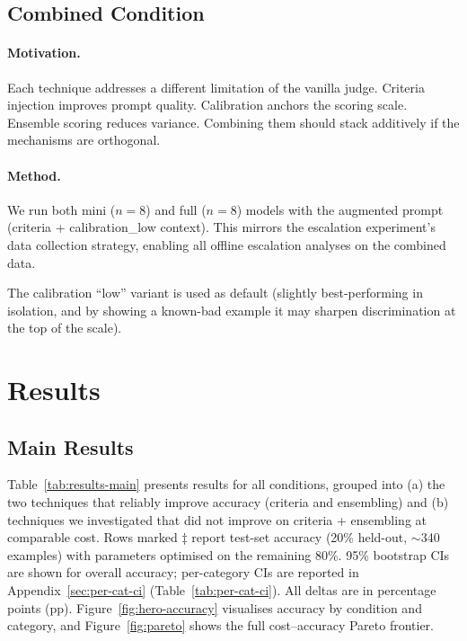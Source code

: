 \documentclass{article}
\begin{document}
\subsection{Combined Condition}
\label{sec:combined}

\paragraph{Motivation.} Each technique addresses a different limitation of the vanilla judge. Criteria injection improves prompt quality. Calibration anchors the scoring scale. Ensemble scoring reduces variance. Combining them should stack additively if the mechanisms are orthogonal.

\paragraph{Method.} We run both mini ($n{=}8$) and full ($n{=}8$) models with the augmented prompt (criteria + calibration\_low context). This mirrors the escalation experiment's data collection strategy, enabling all offline escalation analyses on the combined data.

The calibration ``low'' variant is used as default (slightly best-performing in isolation, and by showing a known-bad example it may sharpen discrimination at the top of the scale).

\section{Results}
\label{sec:experiments}

\subsection{Main Results}
\label{sec:main-results}

Table~\ref{tab:results-main} presents results for all conditions, grouped into (a) the two techniques that reliably improve accuracy (criteria and ensembling) and (b) techniques we investigated that did not improve on criteria + ensembling at comparable cost. Rows marked $\ddagger$ report test-set accuracy (20\% held-out, ${\sim}$340 examples) with parameters optimised on the remaining 80\%. 95\% bootstrap CIs are shown for overall accuracy; per-category CIs are reported in Appendix~\ref{sec:per-cat-ci} (Table~\ref{tab:per-cat-ci}). All deltas are in percentage points (pp). Figure~\ref{fig:hero-accuracy} visualises accuracy by condition and category, and Figure~\ref{fig:pareto} shows the full cost--accuracy Pareto frontier.
\end{document}
